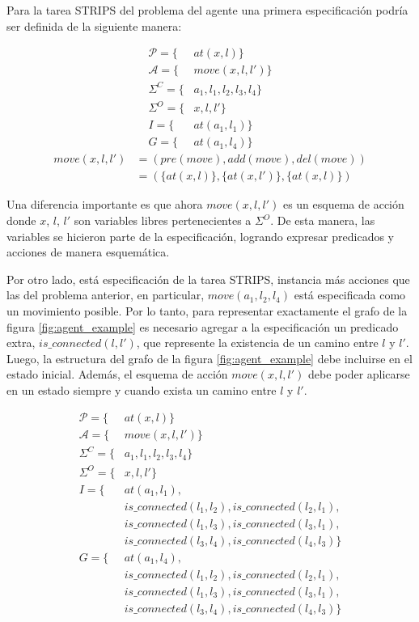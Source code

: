 Para la tarea STRIPS del problema del agente una primera especificación podría ser definida de la siguiente manera:

\begin{align*}
    \mathcal{P} = \{&at(x, l)\} \\
    \mathcal{A} = \{&move(x, l, l')\} \\
    \Sigma^{C} = \{&a_1, l_1, l_2, l_3, l_4\} \\
    \Sigma^{O} = \{&x, l, l'\} \\
    I = \{&at(a_1, l_1)\} \\
    G = \{&at(a_1, l_4)\}
\end{align*}
\begin{align*}
    move(x, l, l') &= (pre(move), add(move), del(move)) \\
                   &= (\{at(x, l)\}, \{at(x, l')\},\{at(x, l)\})
\end{align*}

Una diferencia importante es que ahora $move(x, l, l')$ es un esquema de acción donde $x$, $l$, $l'$ son variables libres pertenecientes a $\Sigma^{O}$. De esta manera, las variables se hicieron parte de la especificación, logrando expresar predicados y acciones de manera esquemática.

Por otro lado, está especificación de la tarea STRIPS, instancia más acciones que las del problema anterior, en particular, $move(a_1, l_2, l_4)$ está especificada como un movimiento posible. Por lo tanto, para representar exactamente el grafo de la figura \ref{fig:agent_example} es necesario agregar a la especificación un predicado extra, $is\_connected(l, l')$, que represente la existencia de un camino entre $l$ y $l'$. Luego, la estructura del grafo de la figura \ref{fig:agent_example} debe incluirse en el estado inicial. Además, el esquema de acción $move(x, l, l')$ debe poder aplicarse en un estado siempre y cuando exista un camino entre $l$ y $l'$.

\begin{align*}
    \mathcal{P} = \{&at(x, l)\} \\
    \mathcal{A} = \{&move(x, l, l')\} \\
    \Sigma^{C} = \{&a_1, l_1, l_2, l_3, l_4\} \\
    \Sigma^{O} = \{&x, l, l'\} \\
    I = \{& at(a_1, l_1), \\
          & is\_connected(l_1, l_2), is\_connected(l_2, l_1), \\
          & is\_connected(l_1, l_3), is\_connected(l_3, l_1), \\
          & is\_connected(l_3, l_4), is\_connected(l_4, l_3)\} \\
    G = \{& at(a_1, l_4), \\
          & is\_connected(l_1, l_2), is\_connected(l_2, l_1), \\
          & is\_connected(l_1, l_3), is\_connected(l_3, l_1), \\
          & is\_connected(l_3, l_4), is\_connected(l_4, l_3)\}
\end{align*}

